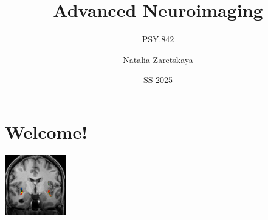\documentclass[
  letterpaper,
]{report}
\title{Advanced Neuroimaging}
\subtitle{PSY.842}
\author{Natalia Zaretskaya}
\date{SS 2025}
\renewcommand*\contentsname{Table of contents}
\newcommand\contentsname{Table of contents}
\begin{document}
\maketitle

\renewcommand*\contentsname{Table of contents}
{
\hypersetup{linkcolor=}
\setcounter{tocdepth}{2}
\tableofcontents
}


\chapter*{Welcome!}\label{welcome}


\includegraphics[width=1.04167in,height=\textheight,keepaspectratio]{images/claus_7TCOR_activity_website.png}
\end{document}
